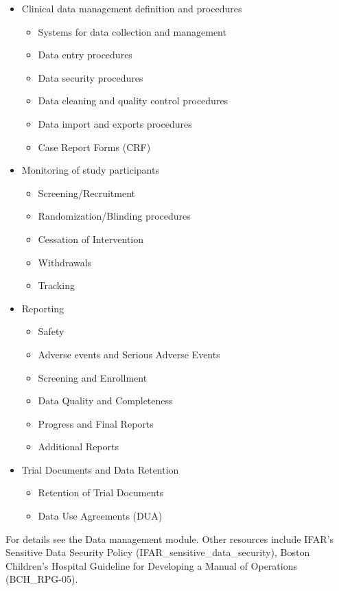 \documentclass[]{book}
\begin{document}
\begin{itemize}
\item
  Clinical data management definition and procedures

  \begin{itemize}
  \item
    Systems for data collection and management
  \item
    Data entry procedures
  \item
    Data security procedures
  \item
    Data cleaning and quality control procedures
  \item
    Data import and exports procedures
  \item
    Case Report Forms (CRF)
  \end{itemize}
\item
  Monitoring of study participants

  \begin{itemize}
  \item
    Screening/Recruitment
  \item
    Randomization/Blinding procedures
  \item
    Cessation of Intervention
  \item
    Withdrawals
  \item
    Tracking
  \end{itemize}
\item
  Reporting

  \begin{itemize}
  \item
    Safety
  \item
    Adverse events and Serious Adverse Events
  \item
    Screening and Enrollment
  \item
    Data Quality and Completeness
  \item
    Progress and Final Reports
  \item
    Additional Reports
  \end{itemize}
\item
  Trial Documents and Data Retention

  \begin{itemize}
  \item
    Retention of Trial Documents
  \item
    Data Use Agreements (DUA)
  \end{itemize}
\end{itemize}

For details see the Data management module. Other resources include
IFAR's Sensitive Data Security Policy (IFAR\_sensitive\_data\_security),
Boston Children's Hospital Guideline for Developing a Manual of
Operations (BCH\_RPG-05).
\end{document}
